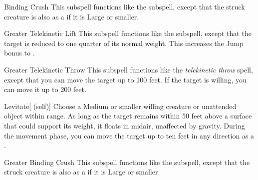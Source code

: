 \begin{ability}[\nth{2}]{Binding Crush}
This subspell functions like the  subspell, except that the struck creature is also  as a  if it is Large or smaller.
\end{ability}
\vspace{0.25em}



\begin{ability}[\nth{3}]{Greater Telekinetic Lift}
This subspell functions like the  subspell, except that the target is reduced to one quarter of its normal weight.
This increases the Jump bonus to .
\end{ability}
\vspace{0.25em}



\begin{ability}[\nth{3}]{Greater Telekinetic Throw}
This subspell functions like the \textit{telekinetic throw} spell, except that you can move the target up to 100 feet.
If the target is willing, you can move it up to 200 feet.
\end{ability}
\vspace{0.25em}



\begin{ability}[\nth{4}]{Levitate}[ (self)]
Choose a Medium or smaller willing creature or unattended object within \rngclose range.
As long as the target remains within 50 feet above a surface that could support its weight, it floats in midair, unaffected by gravity.
During the movement phase, you can move the target up to ten feet in any direction as a .
\end{ability}
\vspace{0.25em}



\begin{ability}[\nth{5}]{Greater Binding Crush}
This subspell functions like the  subspell, except that the struck creature is also  as a  if it is Large or smaller.
\end{ability}
\vspace{0.25em}


